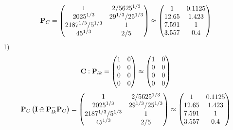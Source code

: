 \documentclass[10pt,a4paper]{article}
\begin{document}
	\[
		\bold{P}_{C} = 
		\begin{pmatrix}
			{1}{} & {{2}} / {{5625^ {1 / 3}}} \\
			{{2025^ {1 / 3}}}{} & {{2}{9^ {1 / 3}}} / {{25^ {1 / 3}}} \\
			{{2187^ {1 / 3}}} / {{5^ {1 / 3}}} & {1}{} \\
			{{45^ {1 / 3}}}{} & {{2}} / {{5}} \\
		\end{pmatrix}
		\approx
		\begin{pmatrix}
			1        & 0.1125   \\
			12.65    & 1.423    \\
			7.591    & 1        \\
			3.557    & 0.4      \\
		\end{pmatrix}
	\]
	1)
	\[
		\bold{C}: \bold{P}_{lk} = 
		\begin{pmatrix}
			{1}{} & {{0}}{} \\
			{{0}}{} & {{0}}{} \\
			{{0}}{} & {{0}}{} \\
			{{0}}{} & {{0}}{} \\
		\end{pmatrix}
		\approx
		\begin{pmatrix}
			1        & 0        \\
			0        & 0        \\
			0        & 0        \\
			0        & 0        \\
		\end{pmatrix}
	\]
	\[
		\bold{P}_{C}\left(\bold{I} \oplus \bold{P}_{lk}^{-}\bold{P}_{C}\right) = 
		\begin{pmatrix}
			{1}{} & {{2}} / {{5625^ {1 / 3}}} \\
			{{2025^ {1 / 3}}}{} & {{2}{9^ {1 / 3}}} / {{25^ {1 / 3}}} \\
			{{2187^ {1 / 3}}} / {{5^ {1 / 3}}} & {1}{} \\
			{{45^ {1 / 3}}}{} & {{2}} / {{5}} \\
		\end{pmatrix}
		\approx
		\begin{pmatrix}
			1        & 0.1125   \\
			12.65    & 1.423    \\
			7.591    & 1        \\
			3.557    & 0.4      \\
		\end{pmatrix}
	\]
\end{document}
